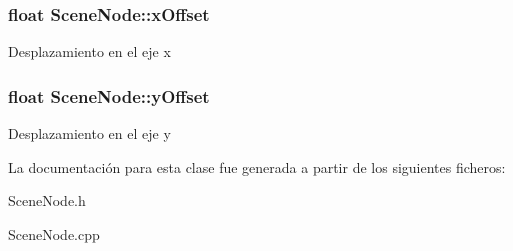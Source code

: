 \subsubsection[{x\+Offset}]{\setlength{\rightskip}{0pt plus 5cm}float Scene\+Node\+::x\+Offset\hspace{0.3cm}{\ttfamily [protected]}}\label{classSceneNode_ad7b83da569e61908f0e828c11549610f}
Desplazamiento en el eje x \hypertarget{classSceneNode_ac2e7bda67762d356a06386e271f41c23}{}
\subsubsection[{y\+Offset}]{\setlength{\rightskip}{0pt plus 5cm}float Scene\+Node\+::y\+Offset\hspace{0.3cm}{\ttfamily [protected]}}\label{classSceneNode_ac2e7bda67762d356a06386e271f41c23}
Desplazamiento en el eje y 

La documentación para esta clase fue generada a partir de los siguientes ficheros\+:\begin{DoxyCompactItemize}
\item 
Scene\+Node.\+h\item 
Scene\+Node.\+cpp\end{DoxyCompactItemize}
